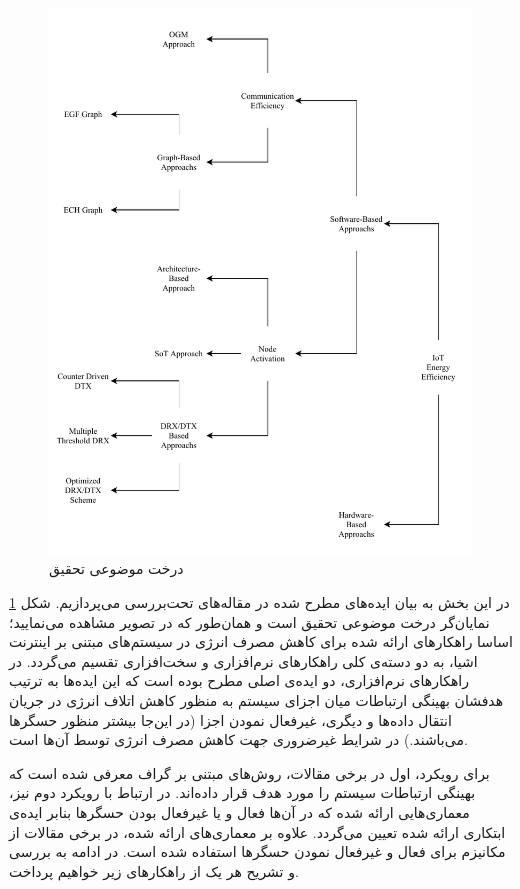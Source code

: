 
\begin{figure}
	\centering
	\includegraphics[width=0.9\linewidth]{figs/subject-tree}
	\caption {درخت موضوعی تحقیق}
	\label{fig:subject-tree}
\end{figure}

\par
در این بخش به بیان ایده‌های مطرح شده در مقاله‌های تحت‌بررسی می‌پردازیم. شکل \ref{fig:subject-tree} نمایان‌گر درخت موضوعی تحقیق است و همان‌طور که در تصویر مشاهده می‌نمایید؛ اساسا راهکارهای ارائه شده برای کاهش مصرف انرژی در سیستم‌های مبتنی بر اینترنت اشیا، به دو دسته‌ی کلی راهکارهای نرم‌افزاری و سخت‌افزاری تقسیم می‌گردد. در راهکارهای نرم‌افزاری، دو ایده‌ی اصلی مطرح بوده است که این ایده‌ها به ترتیب هدفشان بهینگی ارتباطات میان اجزای سیستم به منظور کاهش اتلاف انرژی در جریان انتقال داده‌ها و دیگری، غیرفعال نمودن اجزا (در این‌جا بیشتر منظور حسگرها می‌باشند.) در شرایط غیرضروری جهت کاهش مصرف انرژی توسط آن‌ها است.
\par
برای رویکرد، اول در برخی مقالات، روش‌های مبتنی بر گراف معرفی شده است که بهینگی ارتباطات سیستم را مورد هدف قرار داده‌اند. در ارتباط با رویکرد دوم نیز، معماری‌هایی ارائه شده که در آن‌ها فعال و یا غیرفعال بودن حسگرها بنابر ایده‌ی ابتکاری ارائه شده تعیین می‌گردد. علاوه بر معماری‌های ارائه شده، در برخی مقالات از مکانیزم  برای فعال و غیرفعال نمودن حسگرها استفاده شده است. در ادامه به بررسی و تشریح هر یک از راهکارهای زیر خواهیم پرداخت.

